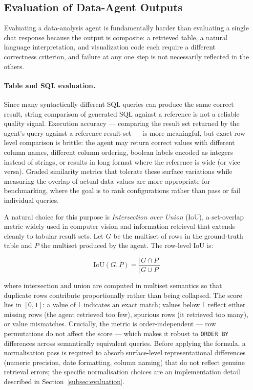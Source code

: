\subsection{Evaluation of Data-Agent Outputs}
\label{sec:outputs}
Evaluating a data-analysis agent is fundamentally harder than evaluating a
single chat response because the output is composite: a retrieved table, a
natural language interpretation, and visualization code each require a
different correctness criterion, and failure at any one step is not necessarily
reflected in the others.

\paragraph{Table and SQL evaluation.}
Since many syntactically different SQL queries can produce the same correct
result, string comparison of generated SQL against a reference is not a reliable
quality signal.
Execution accuracy --- comparing the result set returned by the agent's query
against a reference result set --- is more meaningful, but exact row-level
comparison is brittle: the agent may return correct values with different column
names, different column ordering, boolean labels encoded as integers instead of
strings, or results in long format where the reference is wide (or vice versa).
Graded similarity metrics that tolerate these surface variations while measuring
the overlap of actual data values are more appropriate for benchmarking, where
the goal is to rank configurations rather than pass or fail individual queries.

A natural choice for this purpose is \textit{Intersection over Union} (IoU),
a set-overlap metric widely used in computer vision and information retrieval
that extends cleanly to tabular result sets.
Let $G$ be the multiset of rows in the ground-truth table and $P$ the multiset
produced by the agent.
The row-level IoU is:

\begin{equation}
    \text{IoU}(G, P) = \frac{|G \cap P|}{|G \cup P|}
    \label{eq:iou_general}
\end{equation}

\noindent where intersection and union are computed in multiset semantics so that
duplicate rows contribute proportionally rather than being collapsed.
The score lies in $[0, 1]$: a value of 1 indicates an exact match; values below 1
reflect either missing rows (the agent retrieved too few), spurious rows (it
retrieved too many), or value mismatches.
Crucially, the metric is order-independent — row permutations do not affect
the score — which makes it robust to \texttt{ORDER BY} differences across
semantically equivalent queries.
Before applying the formula, a normalisation pass is required to absorb
surface-level representational differences (numeric precision, date formatting,
column naming) that do not reflect genuine retrieval errors; the specific
normalisation choices are an implementation detail described in
Section~\ref{subsec:evaluation}.

